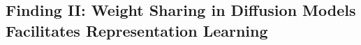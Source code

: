 
\subsection{Finding II: Weight Sharing in Diffusion Models Facilitates Representation Learning}\label{subsec:weight_share}


